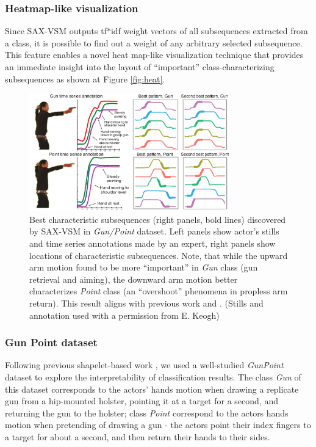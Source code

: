 \documentclass[conference]{IEEEtran}
\begin{document}
\subsubsection{Heatmap-like visualization}
Since SAX-VSM outputs tf$\ast$idf weight vectors of all subsequences extracted from a
class, it is possible to find out a weight of any arbitrary selected subsequence.
This feature enables a novel heat map-like visualization technique that provides an immediate
insight into the layout of ``important'' class-characterizing subsequences 
as shown at Figure \ref{fig:heat}.

\begin{figure}[]
   \centering
   \includegraphics[width=87mm]{figures/gun-point.eps}
   \caption{Best characteristic subsequences (right panels, bold lines) discovered by 
   SAX-VSM in \textit{Gun/Point} dataset. 
   Left panels show actor's stills and time series annotations made by an expert, 
   right panels show locations of characteristic subsequences.
   Note, that while the upward arm motion found to be more ``important'' in \textit{Gun} 
   class (gun retrieval and aiming), the downward arm motion better characterizes 
   \textit{Point} class (an ``overshoot'' phenomena in propless arm return). 
   This result aligns with previous work \cite{shapelet} and \cite{bagnal}.
   (Stills and annotation used with a permission from E. Keogh) }
   \label{fig:shapelet-like-patterns}
   \vspace{-0.2cm}
\end{figure}

\subsubsection{Gun Point dataset}
Following previous shapelet-based work \cite{shapelet} \cite{bagnal}, 
we used a well-studied \textit{GunPoint} dataset \cite{gun} to explore the 
interpretability of classification results. The class \textit{Gun} of this dataset 
corresponds to the actors' hands motion when drawing a replicate gun from 
a hip-mounted holster, pointing it at a target for a second, and returning the 
gun to the holster; class \textit{Point} correspond to the actors hands motion 
when pretending of drawing a gun - the actors point their index fingers to 
a target for about a second, and then return their hands to their sides. 
\end{document}
